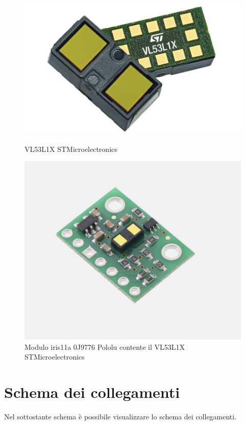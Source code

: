 \documentclass[11pt]{report}
\begin{document}
\begin{figure}[H]
    \centering
    \begin{minipage}{0.45\textwidth}
        \centering
        \includegraphics[width=\textwidth]{images/Immagine_3_VL53L1X.png}
        \caption{VL53L1X STMicroelectronics}
        \label{fig:img1}
    \end{minipage}
    \hfill
    \begin{minipage}{0.45\textwidth}
        \centering
        \includegraphics[width=\textwidth]{images/Immagine_4_Pololu.png}
        \caption{Modulo iris11a 0J9776 Pololu contente il VL53L1X STMicroelectronics}
        \label{fig:img2}
    \end{minipage}
\end{figure}

\section{Schema dei collegamenti}
Nel sottostante schema è possibile visualizzare lo schema dei collegamenti.
\end{document}
